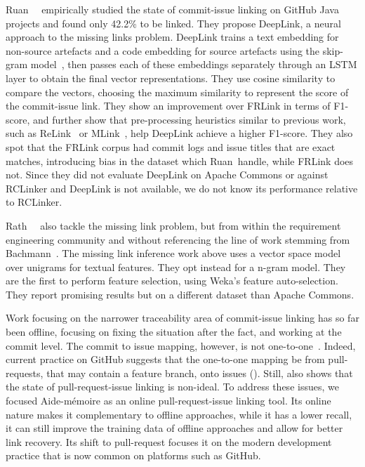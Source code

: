 Ruan~\etal~\cite{ruan2019deeplink} empirically studied the state of commit-issue
linking on GitHub Java projects and found only 42.2\% to be linked. They propose
DeepLink, a neural approach to the missing links problem. DeepLink trains a text
embedding for non-source artefacts and a code embedding for source artefacts
using the skip-gram model~\cite{mikolov2013efficient, mikolov2013distributed},
then passes each of these embeddings separately through an LSTM layer to obtain
the final vector representations. They use cosine similarity to compare the
vectors, choosing the maximum similarity to represent the score of the
commit-issue link. They show an improvement over FRLink in terms of F1-score,
and further show that pre-processing heuristics similar to previous work, such
as ReLink~\cite{relink} or MLink~\cite{MLink}, help DeepLink achieve a higher
F1-score. They also spot that the FRLink corpus had commit logs and issue titles
that are exact matches, introducing bias in the dataset which Ruan~\etal handle,
while FRLink does not. Since they did not evaluate DeepLink on Apache Commons or
against RCLinker and DeepLink is not available, we do not know its performance
relative to RCLinker.

Rath~\etal~\cite{1804.02433} also tackle the missing link problem, but from
within the requirement engineering community and without referencing the line of
work stemming from Bachmann~\etal. The missing link inference work above uses a
vector space model over unigrams for textual features. They opt instead for a
n-gram model. They are the first to perform feature selection, using Weka's
feature auto-selection. They report promising results but on a different dataset
than Apache Commons.

Work focusing on the narrower traceability area of commit-issue linking has so
far been offline, focusing on fixing the situation after the fact, and working
at the commit level. The commit to issue mapping, however, is not
one-to-one~\cite{Kawrykow2011}. Indeed, current practice on GitHub suggests that
the one-to-one mapping be from pull-requests, that may contain a feature branch,
onto issues (). Still,  also
shows that the state of pull-request-issue linking is non-ideal. To address
these issues, we focused Aide-mémoire as an online pull-request-issue linking
tool. Its online nature makes it complementary to offline approaches, while it
has a lower recall, it can still improve the training data of offline approaches
and allow for better link recovery. Its shift to pull-request focuses it on the
modern development practice that is now common on platforms such as GitHub.

